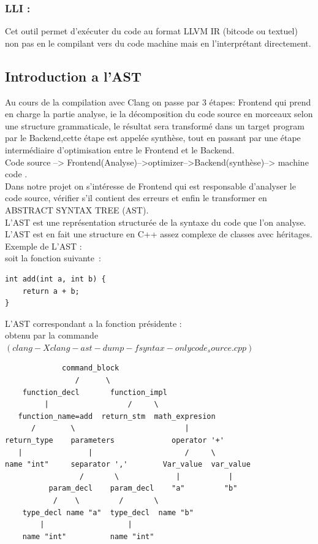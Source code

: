 \documentclass[12pt,titlepage]{article}
\begin{document}
    \subsubsection{ LLI : } 
    Cet outil permet d’exécuter du code au format LLVM IR (bitcode ou textuel) non pas en le compilant vers du code machine mais en l’interprétant directement.
    
\subsection{Introduction a l'AST}

Au cours de la compilation avec Clang on passe par 3 étapes: Frontend qui prend en charge la partie analyse, ie la décomposition du code source en morceaux selon une structure grammaticale, le résultat sera transformé  dans un target program par le Backend,cette étape est appelée synthèse, tout en passant par une étape intermédiaire d'optimisation entre le Frontend et le Backend.\\
Code source --> Frontend(Analyse)-->optimizer-->Backend(synthèse)--> machine code .\\
Dans notre projet on s’intéresse de Frontend qui est responsable d'analyser le code source, vérifier s'il contient des erreurs et enfin le transformer en ABSTRACT SYNTAX TREE (AST).\\
L'AST est une représentation structurée de la syntaxe du code que l'on analyse. \\
L'AST est en fait une structure en C++ assez complexe de classes avec héritages.\\
Exemple de L'AST :\\
soit la fonction  suivante :

\begin{lstlisting}
int add(int a, int b) {
    return a + b;
}
\end{lstlisting}

L'AST correspondant a la fonction présidente :\\
obtenu par la commande $(clang -Xclang -ast-dump -fsyntax-only code_source.cpp) $
\begin{lstlisting}
             command_block
                /      \
    function_decl       function_impl
         |                  /     \
   function_name=add  return_stm  math_expresion
      /        \                         |
return_type    parameters             operator '+'
   |               |                     /     \
name "int"     separator ','        Var_value  var_value
                 /       \             |           |
          param_decl    param_decl    "a"         "b"
           /    \         /       \
    type_decl name "a"  type_decl  name "b"
        |                   |
    name "int"          name "int"
\end{lstlisting}










\pagebreak 

\nocite{*} 


\end{document}
